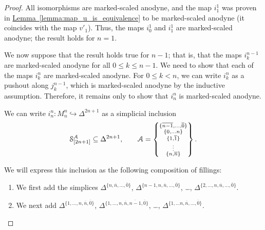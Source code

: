 \documentclass[main.tex]{subfiles}
\begin{document}
\begin{proof}
  All isomorphisms are marked-scaled anodyne, and the map $i^{1}_{1}$ was proven in \hyperref[lemma:map_u_is_equivalence]{Lemma~\ref*{lemma:map_u_is_equivalence}} to be marked-scaled anodyne (it coincides with the map $v'_{1}$). Thus, the maps $i^{1}_{0}$ and $i^{1}_{1}$ are marked-scaled anodyne; the result holds for $n = 1$.

  We now suppose that the result holds true for $n-1$; that is, that the maps $i^{n-1}_{k}$ are marked-scaled anodyne for all $0 \leq k \leq n-1$. We need to show that each of the maps $i^{n}_{k}$ are marked-scaled anodyne. For $0 \leq k < n$, we can write $i^{n}_{k}$ as a pushout along $j^{n-1}_{k}$, which is marked-scaled anodyne by the inductive assumption. Therefore, it remains only to show that $i^{n}_{n}$ is marked-scaled anodyne.

  We can write $i^{n}_{n}\colon M^{n}_{n} \hookrightarrow \Delta^{2n+1}$ as a simplicial inclusion
  \begin{equation*}
    \S^{\mathcal{A}}_{[2n+1]} \subseteq \Delta^{2n+1},\qquad \mathcal{A} = \left\{ \substack{ \{\overline{n-1}, \ldots, \overline{0}\} \\ \{0, \ldots n\} \\ \{1, \overline{1}\} \\ \vdots \\ \{n, \overline{n}\} } \right\}.
  \end{equation*}

  We will express this inclusion as the following composition of fillings:
  \begin{enumerate}
    \item We first add the simplices $\Delta^{\{n, \overline{n}, \ldots, \overline{0}\}}$, $\Delta^{\{n-1, n, \overline{n}, \ldots, \overline{0}\}}$, \dots, $\Delta^{\{2, \ldots, n, \overline{n}, \ldots, \overline{0}\}}$.

    \item We next add $\Delta^{\{1, \ldots, n, \overline{n}, \overline{0}\}}$, $\Delta^{\{1, \ldots, n, \overline{n}, \overline{n-1}, \overline{0}\}}$, \dots, $\Delta^{\{1, \ldots n, \overline{n}, \ldots, \overline{0}\}}$.


\end{enumerate}
\end{proof}
\end{document}
